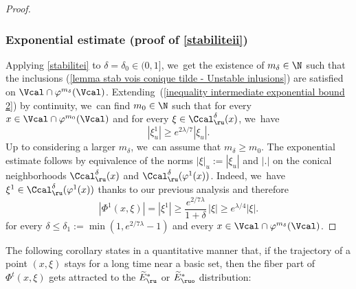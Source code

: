 \begin{proof}
\subsubsection*{Exponential estimate (proof of \eqref{stabiliteii})} Applying \eqref{stabilitei} to $\delta=\delta_0\in(0,1]$, we~get the existence of $m_{\delta} \in \N$ such that the inclusions (\ref{lemma stab vois conique tilde - Unstable inlusions}) are satisfied on $\Vcal \cap \varphi^{m_{\delta}} (\Vcal)$. Extending~(\ref{inequality intermediate exponential bound 2}) by continuity, we~can find $m_0 \in \N$ such that for every $x \in \Vcal \cap \varphi^{m_0} (\Vcal)$ and for every $\xi \in \Ccal_{\ru}^{\delta} (x)$, we~have
\[
|\xi_u^1| \geq e^{2\lambda / 7 } |\xi_u|.
\]
Up to considering a larger $m_{\delta}$, we~can assume that $m_{\delta} \geq m_0$. The exponential estimate follows by equivalence of the norms $|\xi |_u:= |\xi_u|$ and $|.|$ on the conical neighborhoods $\Ccal_\ru^{\delta}(x)$ and $\Ccal_\ru^{\delta}(\varphi^1(x))$. Indeed, we~have $\xi^1 \in \Ccal_\ru^{\delta} (\varphi^1 (x))$ thanks to our previous analysis and therefore
\[
|\Phi^1 (x,\xi)| = |\xi^1| \geq \frac{e^{2/7\lambda}}{1 + \delta}\, |\xi| \geq e^{\lambda /4} |\xi|.
\]
for every $\delta \leq \delta_1:= \min (1, e^{2/7\lambda} - 1)$ and every $x \in \Vcal \cap \varphi^{m_{\delta}} (\Vcal)$.
\end{proof}

The following corollary states in a quantitative manner that, if the trajectory of a point $(x,\xi)$ stays for a long time near a basic set, then the fiber part of $\Phi^t (x,\xi)$ gets attracted to the $\widetilde{E}_\ru^*$ or $\widetilde{E}_{\ruo}^*$ distribution:


